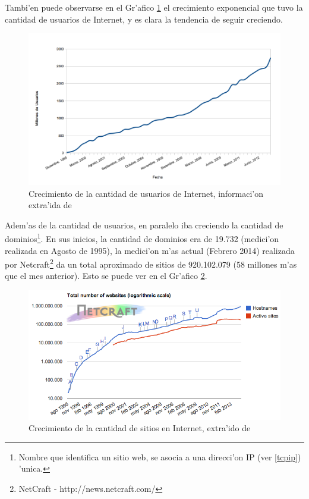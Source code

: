 Tambi'en puede observarse en el Gr'afico \ref{grafCrecInternet} el crecimiento exponencial que tuvo la cantidad de usuarios de Internet, y es clara la tendencia de seguir creciendo.

\begin{figure}[h]
  	\centering
	\includegraphics[width=\textwidth]{img/grafCrecInternet}
	\caption{\small Crecimiento de la cantidad de usuarios de Internet, informaci'on extra'ida de \cite{iws}}
	\label{grafCrecInternet}
\end{figure}

Adem'as de la cantidad de usuarios, en paralelo iba creciendo la cantidad de dominios\footnote{Nombre que identifica un sitio web, se asocia a una direcci'on IP (ver \ref{tcpip}) 'unica.}. En sus inicios, la cantidad de dominios era de 19.732 (medici'on realizada en Agosto de 1995), la medici'on m'as actual (Febrero 2014) realizada por Netcraft\footnote{NetCraft - http://news.netcraft.com/} da un total aproximado de sitios de 920.102.079 \citep{netcraft} (58 millones m'as que el mes anterior). Esto se puede ver en el Gr'afico \ref{grafNetcraft}.

\begin{figure}[h]
  	\centering
	\includegraphics[width=\textwidth]{img/grafNetcraft}
	\caption{\small Crecimiento de la cantidad de sitios en Internet, extra'ido de \cite{netcraft}}
	\label{grafNetcraft}
\end{figure}


